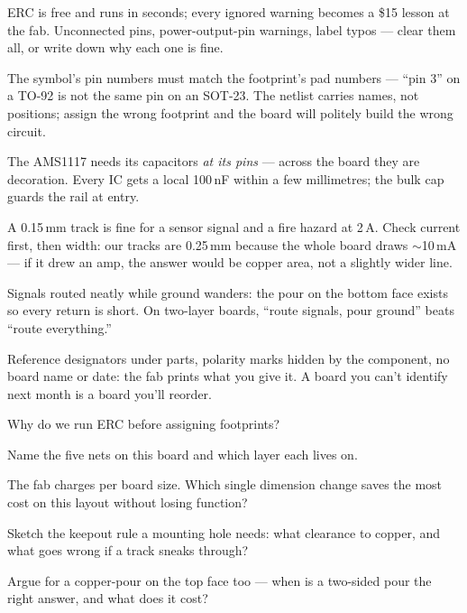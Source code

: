 \begin{tripwire}
ERC is free and runs in seconds; every ignored warning becomes a
\$15 lesson at the fab. Unconnected pins, power-output-pin warnings,
label typos --- clear them all, or write down why each one is fine.
\end{tripwire}
\begin{tripwire}
The symbol's pin numbers must match the footprint's pad numbers ---
``pin 3'' on a TO-92 is not the same pin on an SOT-23. The netlist
carries names, not positions; assign the wrong footprint and the
board will politely build the wrong circuit.
\end{tripwire}
\begin{tripwire}
The AMS1117 needs its capacitors \emph{at its pins} --- across the
board they are decoration. Every IC gets a local 100\,nF within a
few millimetres; the bulk cap guards the rail at entry.
\end{tripwire}
\begin{tripwire}
A 0.15\,mm track is fine for a sensor signal and a fire hazard at
2\,A. Check current first, then width: our tracks are 0.25\,mm
because the whole board draws $\sim$10\,mA --- if it drew an amp,
the answer would be copper area, not a slightly wider line.
\end{tripwire}
\begin{tripwire}
Signals routed neatly while ground wanders: the pour on the bottom
face exists so every return is short. On two-layer boards, ``route
signals, pour ground'' beats ``route everything.''
\end{tripwire}
\begin{tripwire}
Reference designators under parts, polarity marks hidden by the
component, no board name or date: the fab prints what you give it.
A board you can't identify next month is a board you'll reorder.
\end{tripwire}

\begin{exercise}[easy]
Why do we run ERC before assigning footprints?
\end{exercise}
\begin{exercise}[easy]
Name the five nets on this board and which layer each lives on.
\end{exercise}
\begin{exercise}[medium]
The fab charges per board size. Which single dimension change saves
the most cost on this layout without losing function?
\end{exercise}
\begin{exercise}[medium]
Sketch the keepout rule a mounting hole needs: what clearance to
copper, and what goes wrong if a track sneaks through?
\end{exercise}
\begin{exercise}[hard]
Argue for a copper-pour on the top face too --- when is a two-sided
pour the right answer, and what does it cost?
\end{exercise}

